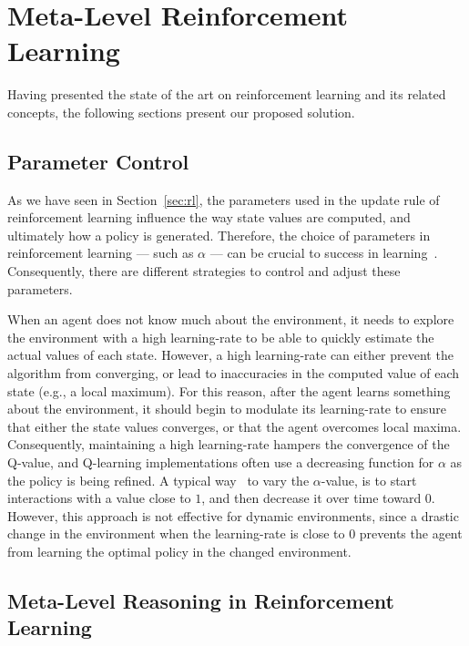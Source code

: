 \chapter{Meta-Level Reinforcement Learning}
\label{chapter:meta-rl}
Having presented the state of the art on reinforcement learning and its related concepts,
the following sections present our proposed solution.


\section{Parameter Control}
\label{sec:parameter-control}

As we have seen in Section~\ref{sec:rl}, the parameters used in the update rule of reinforcement learning influence the way state values are computed, and ultimately how a policy is generated. 
Therefore, the choice of parameters in reinforcement learning
--- such as $\alpha$ ---
can be crucial to success in learning~\cite{schweighofer2003meta}. 
Consequently, there are different strategies to control and adjust these parameters. 

When an agent does not know much about the environment, it needs to explore the environment with a high learning-rate to be able to quickly estimate the actual values of each state. 
However, a high learning-rate can either prevent the algorithm from converging, or lead to inaccuracies in the computed value of each state (e.g., a local maximum). 
For this reason, after the agent learns something about the environment, it should begin to modulate its learning-rate to ensure that either the state values converges, or that the agent overcomes local maxima. 
% 
Consequently, maintaining a high learning-rate hampers the convergence of the Q-value, and Q-learning implementations often use a decreasing function for $\alpha$ as the policy is being refined. 
A typical way~\cite{schweighofer2003meta} to vary the $\alpha$-value, is to start interactions with a value close to $1$, and then decrease it over time toward $0$.
However, this approach is not effective for dynamic environments, since a drastic change in the environment when the learning-rate is close to $0$ prevents the agent from learning the optimal policy in the changed environment. 



\section{Meta-Level Reasoning in Reinforcement Learning}
\label{sec:meta-reasoning-rl}

